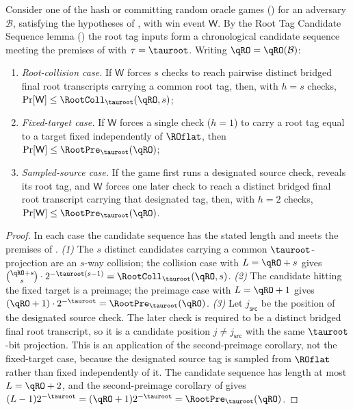 \begin{lemma}
\label{lem:root-tag-hash}
Consider one of the hash or committing \TW{} random oracle games
() for an adversary $\mathcal{B}$, satisfying the
hypotheses of , with win event
$\mathsf{W}$. By the Root
Tag Candidate Sequence lemma
() the root tag inputs form a chronological
candidate sequence meeting the premises of  with
$\tau = \tauroot$. Writing
$\qRO = \qRO(\mathcal{B})$:
\begin{enumerate}
\item \emph{Root-collision case.} If $\mathsf{W}$ forces $s$ checks to
  reach pairwise distinct bridged final root transcripts carrying a
  common root tag, then, with $h = s$ checks,
  $\Pr[\mathsf{W}] \leq \RootColl_{\tauroot}(\qRO, s)$;
\item \emph{Fixed-target case.} If $\mathsf{W}$ forces a single check
  ($h = 1$) to carry a root tag equal to a target fixed independently of
  $\ROflat$, then
  $\Pr[\mathsf{W}] \leq \RootPre_{\tauroot}(\qRO)$;
\item \emph{Sampled-source case.} If the game first runs a designated
  source check, reveals its root tag, and $\mathsf{W}$ forces one later
  check to reach a distinct bridged final root transcript carrying that
  designated tag, then, with $h = 2$ checks,
  $\Pr[\mathsf{W}] \leq \RootPre_{\tauroot}(\qRO)$.
\end{enumerate}
\end{lemma}

\begin{proof}
In each case the candidate sequence has the stated length and meets the
premises of .
\emph{(1)} The $s$ distinct candidates carrying a common
$\tauroot$-projection are an $s$-way collision; the collision case with
$L = \qRO + s$ gives
$\binom{\qRO + s}{s} \cdot 2^{-\tauroot(s-1)}
= \RootColl_{\tauroot}(\qRO, s)$.
\emph{(2)} The candidate hitting the fixed target is a preimage; the
preimage case with $L = \qRO + 1$ gives
$(\qRO + 1) \cdot 2^{-\tauroot} = \RootPre_{\tauroot}(\qRO)$.
\emph{(3)} Let $j_{\mathsf{src}}$ be the position of the designated
source check. The later check is required to be a distinct bridged final
root transcript, so it is a candidate position
$j \neq j_{\mathsf{src}}$ with the same
$\tauroot$-bit projection. This is an application of the second-preimage
corollary, not the fixed-target case, because the designated source tag is
sampled from $\ROflat$ rather than fixed independently of it.
The candidate sequence has length at most $L = \qRO + 2$, and the
second-preimage corollary of  gives
$(L-1)2^{-\tauroot} = (\qRO+1)2^{-\tauroot}
= \RootPre_{\tauroot}(\qRO)$.
\end{proof}

